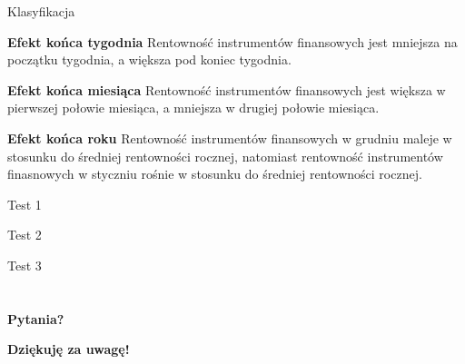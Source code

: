 \documentclass[a4paper, 11pt]{beamer}
\begin{document}
	\begin{frame}{Klasyfikacja}
		\begin{block}{\textbf{Efekt końca tygodnia}}
			Rentowność instrumentów finansowych jest mniejsza na początku tygodnia, a
			większa pod koniec tygodnia.
		\end{block}
		\begin{block}{\textbf{Efekt końca miesiąca}}
			Rentowność instrumentów finansowych jest większa w pierwszej połowie 
			miesiąca, a mniejsza w drugiej połowie miesiąca.
		\end{block}
		\begin{block}{\textbf{Efekt końca roku}}
			Rentowność instrumentów finansowych w grudniu maleje w stosunku do 
			średniej rentowności rocznej, natomiast rentowność instrumentów 
			finasnowych w styczniu rośnie w stosunku do średniej rentowności rocznej.
		\end{block}
	\end{frame}
	
	\begin{frame}{Test 1}
	\end{frame}
	
	\begin{frame}{Test 2}
	\end{frame}
	
	\begin{frame}{Test 3}
	\end{frame}
	
	\section*{}
	
	\begin{frame}
		\center
		\Huge \bfseries
		Pytania?
	\end{frame}

	\begin{frame}
		\center
		\Huge \bfseries
		Dziękuję za uwagę!
	\end{frame}
\end{document}
